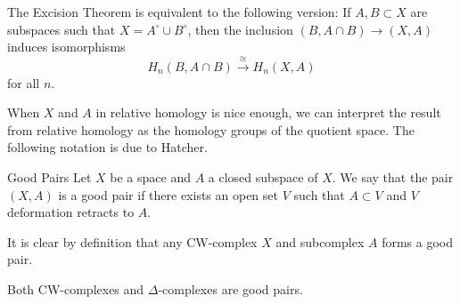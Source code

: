 \documentclass[a4paper]{article}
\begin{document}
\begin{lmm}{}{} The Excision Theorem is equivalent to the following version: If $A,B\subset X$ are subspaces such that $X=A^\circ\cup B^\circ$, then the inclusion $(B,A\cap B)\to (X,A)$ induces isomorphisms $$H_n(B,A\cap B)\overset{\cong}{\longrightarrow} H_n(X,A)$$ for all $n$. 
\end{lmm}

When $X$ and $A$ in relative homology is nice enough, we can interpret the result from relative homology as the homology groups of the quotient space. The following notation is due to Hatcher. 

\begin{defn}{Good Pairs}{} Let $X$ be a space and $A$ a closed subspace of $X$. We say that the pair $(X,A)$ is a good pair if there exists an open set $V$ such that $A\subset V$ and $V$ deformation retracts to $A$. 
\end{defn}

It is clear by definition that any CW-complex $X$ and subcomplex $A$ forms a good pair. 

\begin{lmm}{}{} Both CW-complexes and $\Delta$-complexes are good pairs. 
\end{lmm}
\end{document}
